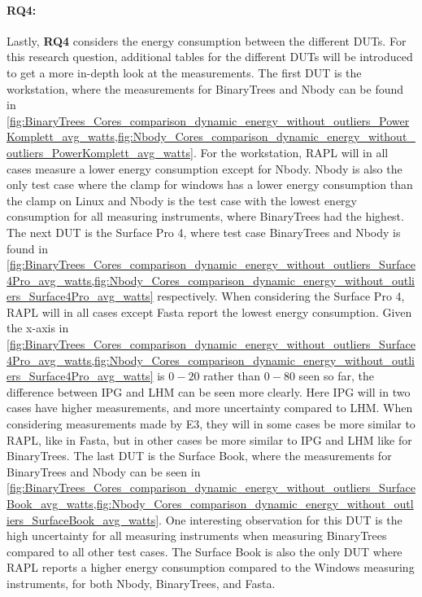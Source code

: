 


\paragraph*{RQ4:} Lastly, \textbf{RQ4} considers the energy consumption between the different DUTs. For this research question, additional tables for the different DUTs will be introduced to get a more in-depth look at the measurements. The first DUT is the workstation, where the measurements for BinaryTrees and Nbody can be found in \cref{fig:BinaryTrees_Cores_comparison_dynamic_energy_without_outliers_PowerKomplett_avg_watts,fig:Nbody_Cores_comparison_dynamic_energy_without_outliers_PowerKomplett_avg_watts}. For the workstation, RAPL will in all cases measure a lower energy consumption except for Nbody. Nbody is also the only test case where the clamp for windows has a lower energy consumption than the clamp on Linux and Nbody is the test case with the lowest energy consumption for all measuring instruments, where BinaryTrees had the highest. The next DUT is the Surface Pro 4, where test case BinaryTrees and Nbody is found in \cref{fig:BinaryTrees_Cores_comparison_dynamic_energy_without_outliers_Surface4Pro_avg_watts,fig:Nbody_Cores_comparison_dynamic_energy_without_outliers_Surface4Pro_avg_watts} respectively. When considering the Surface Pro 4, RAPL will in all cases except Fasta report the lowest energy consumption. Given the x-axis in \cref{fig:BinaryTrees_Cores_comparison_dynamic_energy_without_outliers_Surface4Pro_avg_watts,fig:Nbody_Cores_comparison_dynamic_energy_without_outliers_Surface4Pro_avg_watts} is $0-20$ rather than $0-80$ seen so far, the difference between IPG and LHM can be seen more clearly. Here IPG will in two cases have higher measurements, and more uncertainty compared to LHM. When considering measurements made by E3, they will in some cases be more similar to RAPL, like in Fasta, but in other cases be more similar to IPG and LHM like for BinaryTrees. The last DUT is the Surface Book, where the measurements for BinaryTrees and Nbody can be seen in \cref{fig:BinaryTrees_Cores_comparison_dynamic_energy_without_outliers_SurfaceBook_avg_watts,fig:Nbody_Cores_comparison_dynamic_energy_without_outliers_SurfaceBook_avg_watts}. One interesting observation for this DUT is the high uncertainty for all measuring instruments when measuring BinaryTrees compared to all other test cases. The Surface Book is also the only DUT where RAPL reports a higher energy consumption compared to the Windows measuring instruments, for both Nbody, BinaryTrees, and Fasta.


